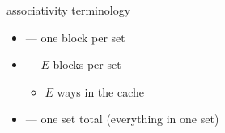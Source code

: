 \begin{frame}{associativity terminology}
\begin{itemize}
\item {} --- one block per set
\item {} --- $E$ blocks per set
    \begin{itemize}
    \item $E$ ways in the cache
    \end{itemize}
\item {} --- one set total (everything in one set)
\end{itemize}
\end{frame}
